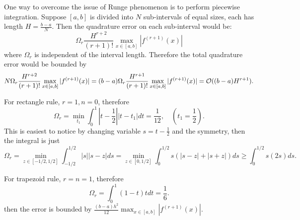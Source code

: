 One way to overcome the issue of Runge phenomenon is to perform piecewise integration. Suppose $[a, b]$ is divided into $N$ sub-intervals of equal sizes, each has length $H = \frac{b-a}{N}$. Then the quadrature error on each sub-interval would be:
$$\Omega_r \frac{H^{r+2}}{(r+1)!}   \max_{x\in[a,b]}|f^{(r+1)}(x)|$$
where $\Omega_r$ is independent of the interval length. Therefore the total quadrature error would be bounded by 
$$N\Omega_r \frac{H^{r+2}}{(r+1)!}   \max_{x\in[a,b]}|f^{(r+1)}(x)| =  (b-a)\Omega_r \frac{H^{r+1}}{(r+1)!}   \max_{x\in[a,b]}|f^{(r+1)}(x)| =\mathcal O((b-a)H^{r+1}).$$
\begin{example} 
    For rectangle rule, $r = 1, n= 0$, therefore 
    \begin{equation}
        \Omega_r = \min_{t_1} \int_0^1 |t - \frac{1}{2}||t - t_1| dt  = \frac{1}{12}, \quad (t_1 = \frac{1}{2}).
    \end{equation}
This is easiest to notice by changing variable $s = t - \frac{1}{2}$ and the symmetry, then the integral is just 
$$\Omega_r = \min_{z\in [-1/2, 1/2]} \int_{-1/2}^{1/2} |s||s - z| ds =  \min_{z\in [0, 1/2]} \int_{0}^{1/2} s (|s - z| + |s + z|) ds \ge   \int_{0}^{1/2} s (2s) ds. $$ 
\end{example}
\begin{example}
    For trapezoid rule, $r = n = 1$, therefore 
    \begin{equation}
        \Omega_r = \int_0^1 (1-t)t dt = \frac{1}{6}.
    \end{equation}
    then the error is bounded by $\frac{(b-a)h^2}{12}  \max_{x\in[a,b]}|f^{(r+1)}(x)|$. 
\end{example}

